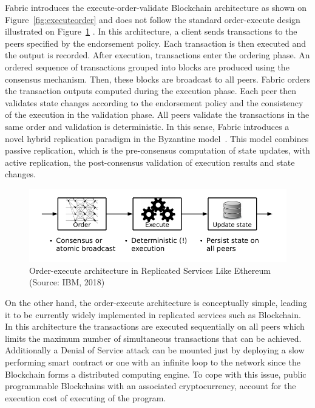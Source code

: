 Fabric introduces the execute-order-validate Blockchain architecture as shown
on Figure~\ref{fig:executeorder} and does not follow the standard order-execute
design illustrated on Figure~\ref{fig:orderexecute} \cite{Androulaki2018}. In
this architecture, a client sends transactions to the peers specified by the
endorsement policy. Each transaction is then executed and the output is
recorded. After execution, transactions enter the ordering phase. An ordered
sequence of transactions grouped into blocks are produced using the consensus
mechanism. Then, these blocks are broadcast to all peers. Fabric orders the
transaction outputs computed during the execution phase. Each peer then
validates state changes according to the endorsement policy and the consistency
of the execution in the validation phase. All peers validate the transactions
in the same order and validation is deterministic. In this sense, Fabric
introduces a novel hybrid replication paradigm in the Byzantine
model~\cite{Androulaki2018}. This model combines passive replication, which is
the pre-consensus computation of state updates, with active replication, the
post-consensus validation of execution results and state changes.

\begin{figure}[h]
  \centering
  \includegraphics[width=0.8\linewidth]{imgs/orderExecuteArchitecture.png}
  \caption{\label{fig:orderexecute} Order-execute architecture in Replicated
  Services Like Ethereum (Source: IBM, 2018)}
\end{figure}

On the other hand, the order-execute architecture is conceptually simple,
leading it to be currently widely implemented in replicated services such as
Blockchain. In this architecture the transactions are executed sequentially on
all peers which limits the maximum number of simultaneous transactions that can
be achieved.  Additionally a Denial of Service attack can be mounted just by
deploying a slow performing smart contract or one with an infinite loop to the
network since the Blockchain forms a distributed computing engine.  To cope
with this issue, public programmable Blockchains with an associated
cryptocurrency, account for the execution cost of executing of the program.


